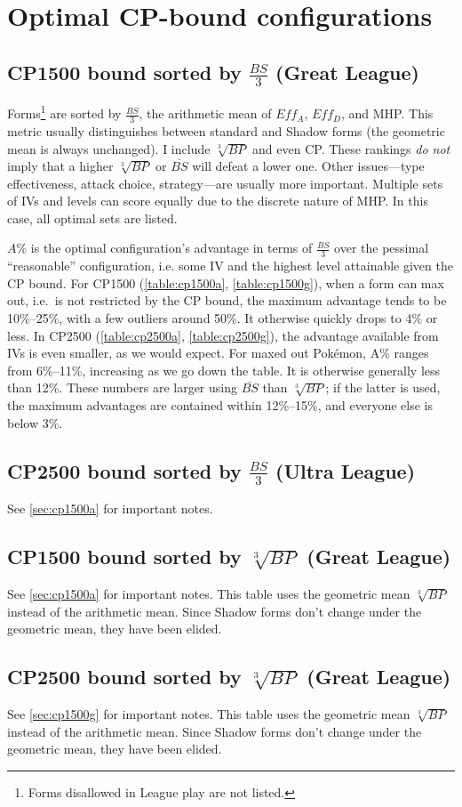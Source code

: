 \chapter{Optimal CP-bound configurations\label{chap:optimal}}
\section{CP1500 bound sorted by $\frac{BS}{3}$ (Great League)\label{sec:cp1500a}}
Forms\footnote{Forms disallowed in League play are not listed.} are sorted by $\frac{BS}{3}$,
  the arithmetic mean of $Eff_A$, $Eff_D$, and MHP\@.
This metric usually distinguishes between standard and Shadow forms (the geometric mean is always unchanged).
I include $\sqrt[3]{BP}$ and even CP\@.
These rankings \textit{do not} imply that a higher $\sqrt[3]{BP}$ or $\overline{BS}$
  will defeat a lower one.
Other issues---type effectiveness, attack choice, strategy---are usually more important.
Multiple sets of IVs and levels can score equally due to the discrete nature of MHP\@.
In this case, all optimal sets are listed.

$A\%$ is the optimal configuration's advantage in terms of $\frac{BS}{3}$
  over the pessimal ``reasonable'' configuration, i.e. some IV
  and the highest level attainable given the CP bound.
For CP1500 (\autoref{table:cp1500a}, \autoref{table:cp1500g}), when a form can max out, i.e.\ is not restricted by the CP bound,
  the maximum advantage tends to be 10\%--25\%, with a few outliers around 50\%.
It otherwise quickly drops to 4\% or less.
In CP2500 (\autoref{table:cp2500a}, \autoref{table:cp2500g}), the advantage available from IVs is even smaller, as we would expect.
For maxed out Pokémon, A\% ranges from 6\%--11\%, increasing as we go down the table.
It is otherwise generally less than 12\%.
These numbers are larger using $\overline{BS}$ than $\sqrt[3]{BP}$; if the latter is used,
  the maximum advantages are contained within 12\%--15\%, and everyone
  else is below 3\%.

\section{CP2500 bound sorted by $\frac{BS}{3}$ (Ultra League)}
See \autoref{sec:cp1500a} for important notes.

\section{CP1500 bound sorted by $\sqrt[3]{BP}$ (Great League)\label{sec:cp1500g}}
See \autoref{sec:cp1500a} for important notes.
This table uses the geometric mean $\sqrt[3]{BP}$ instead of the arithmetic mean.
Since Shadow forms don't change under the geometric mean, they have been elided.

\section{CP2500 bound sorted by $\sqrt[3]{BP}$ (Great League)\label{sec:cp2500g}}
See \autoref{sec:cp1500g} for important notes.
This table uses the geometric mean $\sqrt[3]{BP}$ instead of the arithmetic mean.
Since Shadow forms don't change under the geometric mean, they have been elided.

